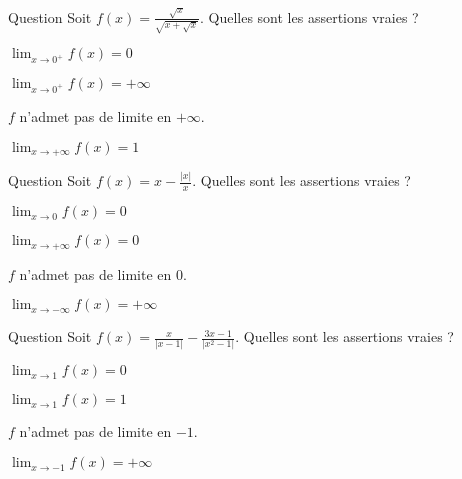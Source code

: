 \begin{multi}[multiple,feedback=
{\(f(x)= \frac{1}{\sqrt{1+\frac{1}{\sqrt{x}}}}.\)
}]{Question}
Soit \(f(x)= \frac{\sqrt x}{\sqrt{x+\sqrt{x}}}\). Quelles sont les assertions vraies ?

    \item* \(\lim_{x\to 0^+} f(x)=0\)
    \item \(\lim_{x\to 0^+} f(x)=+\infty\)
    \item \(f\) n'admet pas de limite en \(+\infty\).
    \item* \(\lim_{x\to +\infty} f(x)=1\)
\end{multi}


\begin{multi}[multiple,feedback=
{En utilisant la définition de la  valeur absolue, \(f(x)=\left\{\begin{array}{cc}x-1,& \mbox{si} \, \, x >0 \\ x+1,& \mbox{si} \,  x <0  \end{array}\right.\).
}]{Question}
Soit \(f(x)= x-\frac{|x|}{x}\). Quelles sont les assertions vraies ?

    \item \(\lim_{x\to 0} f(x)=0\)
    \item \(\lim_{x\to +\infty} f(x)=0\)
    \item* \(f\) n'admet pas de limite en \(0\).
    \item \(\lim_{x\to -\infty} f(x)=+\infty\)
\end{multi}


\begin{multi}[multiple,feedback=
{En utilisant la définition de la valeur absolue, 
\(f(x)=\left\{\begin{array}{ccc}\frac{x^2+4x-1}{1-x^2},& \mbox{si} \, x \le -1 \\ 
\frac{1-x}{1+x} ,& \mbox{si} \,  -1\le x \le 1\\
\frac{x-1}{1+x} ,& \mbox{si} \,  x \ge 1 \end{array}\right.\)
}]{Question}
Soit \(f(x)= \frac{x}{|x-1|}-\frac{3x-1}{|x^2-1|}\). Quelles sont les assertions vraies ?

    \item* \(\lim_{x\to 1} f(x)=0\)
    \item \(\lim_{x\to 1} f(x)=1\)
    \item \(f\) n'admet pas de limite en \(-1\).
    \item* \(\lim_{x\to -1} f(x)=+\infty\)
\end{multi}


